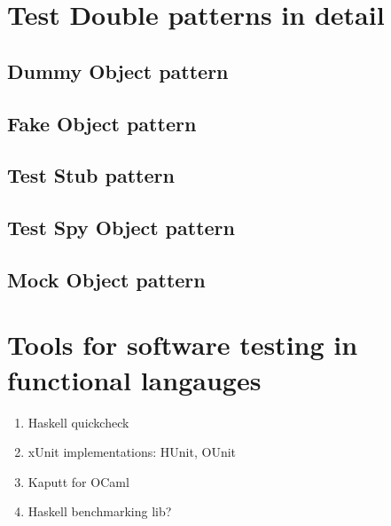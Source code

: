 \section{Test Double patterns in detail}
\label{testdoubles}

\subsection{Dummy Object pattern}
\label{testdoubles:dummy}

\subsection{Fake Object pattern}
\label{testdoubles:fake}

\subsection{Test Stub pattern}
\label{testdoubles:stub}

\subsection{Test Spy Object pattern}
\label{testdoubles:spy}

\subsection{Mock Object pattern}
\label{testdoubles:mocks}

\section{Tools for software testing in functional langauges}
\label{testtools}

\begin{enumerate}
\item Haskell quickcheck
\item xUnit implementations: HUnit, OUnit
\item Kaputt for OCaml
\item Haskell benchmarking lib?
\end{enumerate}
